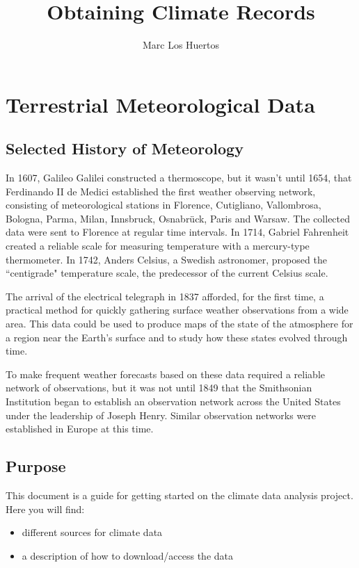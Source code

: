 \documentclass{article}\usepackage[]{graphicx}\usepackage[]{color}
\title{Obtaining Climate Records}
\author{Marc Los Huertos}
\begin{document}
\maketitle

\section{Terrestrial Meteorological Data}

\subsection{Selected History of Meteorology}

In 1607, Galileo Galilei constructed a thermoscope, but it wasn't until 1654, that Ferdinando II de Medici established the first weather observing network, consisting of meteorological stations in Florence, Cutigliano, Vallombrosa, Bologna, Parma, Milan, Innsbruck, Osnabrück, Paris and Warsaw. The collected data were sent to Florence at regular time intervals. In 1714, Gabriel Fahrenheit created a reliable scale for measuring temperature with a mercury-type thermometer. In 1742, Anders Celsius, a Swedish astronomer, proposed the ``centigrade" temperature scale, the predecessor of the current Celsius scale.

The arrival of the electrical telegraph in 1837 afforded, for the first time, a practical method for quickly gathering surface weather observations from a wide area. This data could be used to produce maps of the state of the atmosphere for a region near the Earth's surface and to study how these states evolved through time. 

To make frequent weather forecasts based on these data required a reliable network of observations, but it was not until 1849 that the Smithsonian Institution began to establish an observation network across the United States under the leadership of Joseph Henry. Similar observation networks were established in Europe at this time. 

\subsection{Purpose}
This document is a guide for getting started on the climate data analysis project. Here you will find: 
\begin{itemize}
\item different sources for climate data
\item a description of how to download/access the data
\end{itemize}
\end{document}
